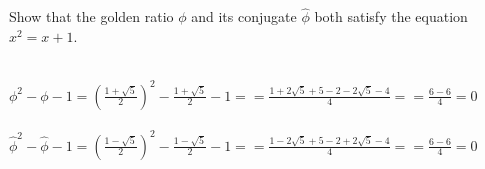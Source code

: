 \documentclass[addpoints,11pt]{exam}
\begin{document}
\begin{questions}
		
		\question[5]
		Show that the golden ratio $\phi$ and its conjugate $\hat\phi$ both satisfy the equation $x^2 = x+1$.
		\begin{solutionorbox}\\
			$\phi^2 - \phi - 1 = (\frac{1 + \sqrt{5}}{2})^2 - \frac{1 + \sqrt{5}}{2} - 1 == \frac{1 + 2\sqrt{5} + 5 - 2 - 2\sqrt{5} - 4}{4} == \frac{6 - 6}{4} = 0$\\ \\
			$\hat\phi^2 - \hat\phi - 1 = (\frac{1 - \sqrt{5}}{2})^2 - \frac{1 - \sqrt{5}}{2} - 1 == \frac{1 - 2\sqrt{5} + 5 - 2 + 2\sqrt{5} - 4}{4} == \frac{6 - 6}{4} = 0$
		\end{solutionorbox}
		
		\ifprintanswers
		\newpage
		\else
		\bigskip
		\fi
		

\end{questions}
\end{document}
